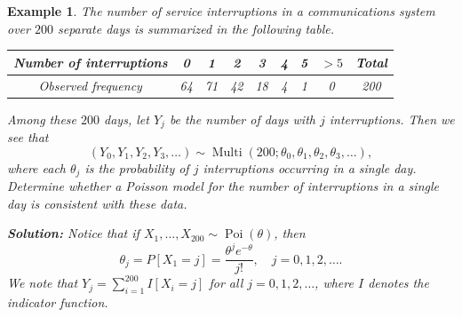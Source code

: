 \documentclass[10pt]{article}
\DeclareMathOperator{\Multi}{Multi}
\DeclareMathOperator{\Poi}{Poi}
\theoremstyle{newstyle}
\newtheorem{exmp}[thm]{Example}
\begin{document}
\begin{exmp}
The number of service interruptions in a communications system over $200$ separate days is summarized 
in the following table. 
\begin{table}[H]
\centering
\begin{tabular}{|c|c|c|c|c|c|c|c|c|}
\hline
Number of interruptions & 0  & 1  & 2  & 3  & 4 & 5 & $>5$ & Total \\ \hline
Observed frequency      & 64 & 71 & 42 & 18 & 4 & 1 & 0    & 200   \\ \hline
\end{tabular}
\end{table}
Among these $200$ days, let $Y_j$ be the number of days with $j$ interruptions. Then we see that 
\[ (Y_0, Y_1, Y_2, Y_3, \dots) \sim \Multi(200; \theta_0, \theta_1, \theta_2, \theta_3, \dots), \]
where each $\theta_j$ is the probability of $j$ interruptions occurring in a single day. 
Determine whether a Poisson model for the number of interruptions in a single day is consistent 
with these data. 

{\color{blue}
{\bf Solution:} 
Notice that if $X_1, \dots, X_{200} \sim \Poi(\theta)$, then 
\[ \theta_j = P[X_1 = j] = \frac{\theta^j e^{-\theta}}{j!}, \quad j = 0, 1, 2, \dots. \]
We note that $Y_j = \sum_{i=1}^{200} I[X_i = j]$ for all $j = 0, 1, 2, \dots$, where $I$ denotes the 
indicator function.

}
\end{exmp}
\end{document}
